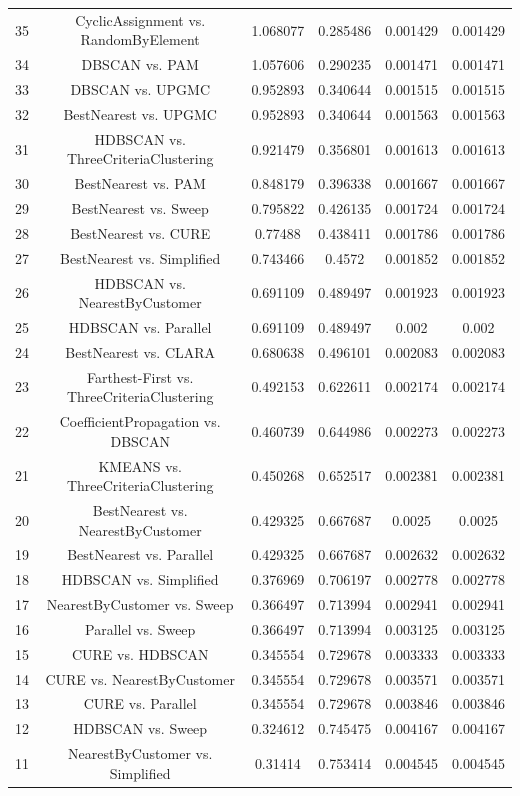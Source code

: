 \documentclass[a4paper,10pt]{article}
\begin{document}
\begin{landscape}
\begin{table}[!htp]
\begin{tabular}{cccccc}
35&CyclicAssignment vs. RandomByElement&1.068077&0.285486&0.001429&0.001429\\
34&DBSCAN vs. PAM&1.057606&0.290235&0.001471&0.001471\\
33&DBSCAN vs. UPGMC&0.952893&0.340644&0.001515&0.001515\\
32&BestNearest vs. UPGMC&0.952893&0.340644&0.001563&0.001563\\
31&HDBSCAN vs. ThreeCriteriaClustering&0.921479&0.356801&0.001613&0.001613\\
30&BestNearest vs. PAM&0.848179&0.396338&0.001667&0.001667\\
29&BestNearest vs. Sweep&0.795822&0.426135&0.001724&0.001724\\
28&BestNearest vs. CURE&0.77488&0.438411&0.001786&0.001786\\
27&BestNearest vs. Simplified&0.743466&0.4572&0.001852&0.001852\\
26&HDBSCAN vs. NearestByCustomer&0.691109&0.489497&0.001923&0.001923\\
25&HDBSCAN vs. Parallel&0.691109&0.489497&0.002&0.002\\
24&BestNearest vs. CLARA&0.680638&0.496101&0.002083&0.002083\\
23&Farthest-First vs. ThreeCriteriaClustering&0.492153&0.622611&0.002174&0.002174\\
22&CoefficientPropagation vs. DBSCAN&0.460739&0.644986&0.002273&0.002273\\
21&KMEANS vs. ThreeCriteriaClustering&0.450268&0.652517&0.002381&0.002381\\
20&BestNearest vs. NearestByCustomer&0.429325&0.667687&0.0025&0.0025\\
19&BestNearest vs. Parallel&0.429325&0.667687&0.002632&0.002632\\
18&HDBSCAN vs. Simplified&0.376969&0.706197&0.002778&0.002778\\
17&NearestByCustomer vs. Sweep&0.366497&0.713994&0.002941&0.002941\\
16&Parallel vs. Sweep&0.366497&0.713994&0.003125&0.003125\\
15&CURE vs. HDBSCAN&0.345554&0.729678&0.003333&0.003333\\
14&CURE vs. NearestByCustomer&0.345554&0.729678&0.003571&0.003571\\
13&CURE vs. Parallel&0.345554&0.729678&0.003846&0.003846\\
12&HDBSCAN vs. Sweep&0.324612&0.745475&0.004167&0.004167\\
11&NearestByCustomer vs. Simplified&0.31414&0.753414&0.004545&0.004545\\

\end{tabular}
\end{table}
\end{landscape}
\end{document}
